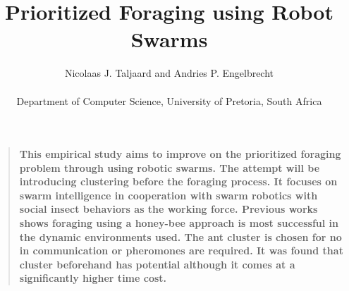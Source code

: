\documentclass[12pt]{article}
\title{Prioritized Foraging using Robot Swarms}
\author
{Nicolaas J. Taljaard and Andries P. Engelbrecht\\
\\
\normalsize{Department of Computer Science, University of Pretoria, South Africa}\\
}
\date{}
\newenvironment{sciabstract}{%
\begin{quote} \bf}
{\end{quote}}
\begin{document}
 


\baselineskip24pt


\maketitle 




\begin{sciabstract}
  This empirical study aims to improve on the prioritized foraging problem through using robotic swarms. The attempt will be introducing clustering before the foraging process. It focuses on swarm intelligence in cooperation with swarm robotics with social insect behaviors as the working force. Previous works shows foraging using a honey-bee approach is most successful in the dynamic environments used. The ant cluster is chosen for no in communication or pheromones are required. It was found that cluster beforehand has potential although it comes at a significantly higher time cost.
\end{sciabstract}


\end{document}
